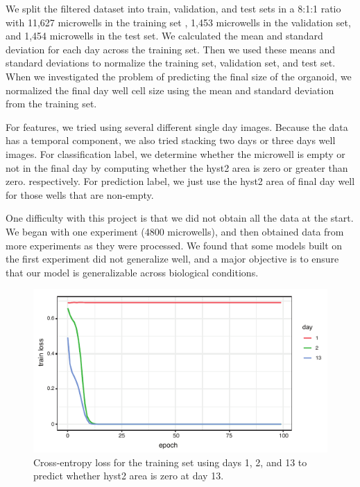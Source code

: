 \documentclass[10pt,twocolumn,letterpaper]{article}
\begin{document}
We split the filtered dataset into train, validation, and test sets in a 8:1:1 ratio with 11,627 microwells in the training set , 1,453 microwells in the validation set, and 1,454 microwells in the test set. We calculated the mean and standard deviation for each day across the training set. Then we used these means and standard deviations to normalize the training set, validation set, and test set. When we investigated the problem of predicting the final  size of the organoid, we normalized the final day well cell size using the mean and standard deviation from the training set.

For features, we tried using several different single day images.  Because the data has a temporal component, we also tried stacking two days or three days well images. For classification label, we determine whether the microwell is empty or not in the final day by computing whether the hyst2 area is zero or greater than zero. respectively. For prediction label, we just use the hyst2 area of final day well for those wells that are non-empty. 

One difficulty with this project is that we did not obtain all the data at the start.  We began with one experiment (4800 microwells), and then obtained data from more experiments as they were processed.   We found that some models built on the first experiment did not generalize well, and a major objective is to ensure that our model is generalizable across biological conditions.

 \begin{figure}[b!]
\begin{center}
 \includegraphics[width=0.9\linewidth]{figures/day13_train_loss_vs_epoch_vs_day_v2.pdf}
\end{center}
   \caption{Cross-entropy loss for the training set using days 1, 2, and 13 to predict whether hyst2 area is zero at day 13.}
\label{train_loss_day_1_2_13}
\end{figure}
\end{document}
